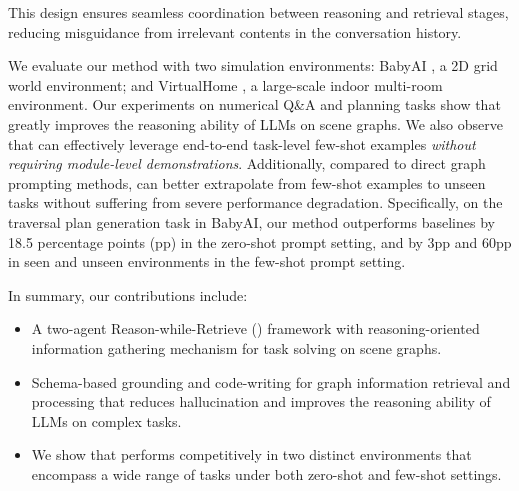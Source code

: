 This design ensures seamless coordination between reasoning and retrieval stages, reducing misguidance from irrelevant contents in the conversation history.


We evaluate our method with two simulation environments: BabyAI \citep{babyai}, a 2D grid world environment; and VirtualHome \citep{virtualhome}, a large-scale indoor multi-room environment.
Our experiments on numerical Q\&A and planning tasks show that \RwR greatly improves the reasoning ability of LLMs on scene graphs. 
We also observe that \RwR can effectively leverage end-to-end task-level few-shot examples \textit{without requiring module-level demonstrations}. 
Additionally, compared to direct graph prompting methods, \RwR can better extrapolate from few-shot examples to unseen tasks without suffering from severe performance degradation.
Specifically, on the traversal plan generation task in BabyAI, our method outperforms baselines by 18.5 percentage points (pp) in the zero-shot prompt setting, and by 3pp and 60pp in seen and unseen environments in the few-shot prompt setting.

In summary, our contributions include:
\begin{itemize}
   \item A two-agent Reason-while-Retrieve (\RwR) framework with reasoning-oriented information gathering mechanism for task solving on scene graphs. 
   \item Schema-based grounding and code-writing for graph information retrieval and processing that reduces hallucination and improves the reasoning ability of LLMs on complex tasks. 
   \item We show that \RwR performs competitively in two distinct environments that encompass a wide range of tasks under both zero-shot and few-shot settings.
\end{itemize}
